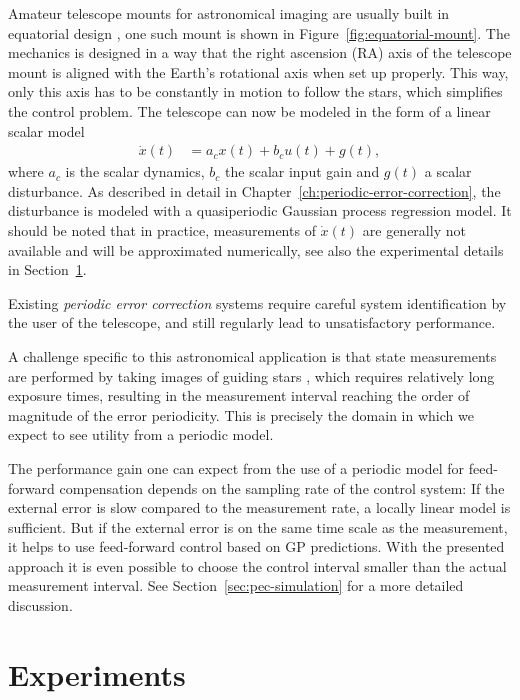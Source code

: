 Amateur telescope mounts for astronomical imaging are usually built in
equatorial design %
,
one such mount is shown in Figure~\ref{fig:equatorial-mount}. The mechanics is
designed in a way that the right ascension (RA) axis of the telescope mount is
aligned with the Earth's rotational axis when set up properly. This way, only
this axis has to be constantly in motion to follow the stars, which simplifies
the control problem. The telescope can now be modeled in the form of a linear
scalar model
\begin{align}
\label{eq:telescope-problem}
  \dot x(t) &= a_cx(t) + b_cu(t) + g(t),
\end{align}
where $a_c$ is the scalar dynamics, $b_c$ the scalar input gain and $g(t)$ a
scalar disturbance. As described in detail in
Chapter~\ref{ch:periodic-error-correction}, the disturbance is modeled with a
quasiperiodic Gaussian process regression model. It should be noted that in
practice, measurements of $\dot x(t)$ are generally not available and will be
approximated numerically, see also the experimental details in
Section~\ref{sec:pec-experiments}.

Existing \emph{periodic error correction} systems require careful system
identification by the user of the telescope, and still regularly lead to
unsatisfactory performance.

A challenge specific to this astronomical application is that state
measurements are performed by taking images of guiding stars
, which
requires relatively long exposure times, resulting in the measurement interval
reaching the order of magnitude of the error periodicity. This is precisely the
domain in which we expect to see utility from a periodic model.

The performance gain one can expect from the use of a periodic model for
feed-forward compensation depends on the sampling rate of the control system:
If the external error is slow compared to the measurement rate, a locally
linear model is sufficient. But if the external error is on the same time scale
as the measurement, it helps to use feed-forward control based on GP
predictions. With the presented approach it is even possible to choose the
control interval smaller than the actual measurement interval. See
Section~\ref{sec:pec-simulation} for a more detailed discussion.

\section{Experiments}
\label{sec:pec-experiments}

